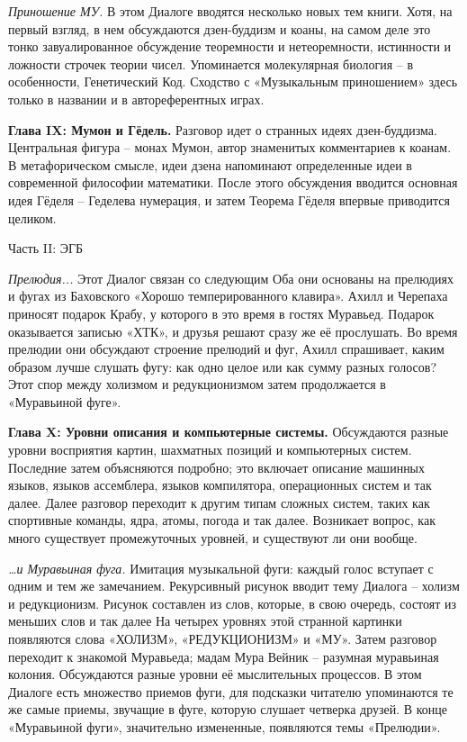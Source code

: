 \documentclass[../main.tex]{subfiles}
\begin{document}
\emph{Приношение МУ.}
В этом Диалоге вводятся несколько новых тем книги. Хотя, на первый взгляд, в нем обсуждаются дзен-буддизм и коаны, на самом деле это тонко завуалированное обсуждение теоремности и нетеоремности, истинности и ложности строчек теории чисел. Упоминается молекулярная биология \--- в особенности, Генетический Код. Сходство с «Музыкальным приношением» здесь только в названии и в автореферентных играх.

\textbf{Глава IX: Мумон и Гёдель.}
Разговор идет о странных идеях дзен-буддизма. Центральная фигура \--- монах Мумон, автор знаменитых комментариев к коанам. В метафорическом смысле, идеи дзена напоминают определенные идеи в современной философии математики. После этого обсуждения вводится основная идея Гёделя \--- Геделева нумерация, и затем Теорема Гёделя впервые приводится целиком.


\begin{center}
    \Large
    Часть II: ЭГБ
\end{center}

\emph{Прелюдия...}
Этот Диалог связан со следующим Оба они основаны на прелюдиях и фугах из Баховского «Хорошо темперированного клавира». Ахилл и Черепаха приносят подарок Крабу, у которого в это время в гостях Муравьед. Подарок оказывается записью «ХТК», и друзья решают сразу же её прослушать. Во время прелюдии они обсуждают строение прелюдий и фуг, Ахилл спрашивает, каким образом лучше слушать фугу: как одно целое или как сумму разных голосов? Этот спор между холизмом и редукционизмом затем продолжается в «Муравьиной фуге».

\textbf{Глава X: Уровни описания и компьютерные системы.}
Обсуждаются разные уровни восприятия картин, шахматных позиций и компьютерных систем. Последние затем объясняются подробно; это включает описание машинных языков, языков ассемблера, языков компилятора, операционных систем и так далее. Далее разговор переходит к другим типам сложных систем, таких как спортивные команды, ядра, атомы, погода и так далее. Возникает вопрос, как много существует промежуточных уровней, и существуют ли они вообще.

\emph{\ldots и Муравьиная фуга.}
Имитация музыкальной фуги: каждый голос вступает с одним и тем же замечанием. Рекурсивный рисунок вводит тему Диалога \--- холизм и редукционизм. Рисунок составлен из слов, которые, в свою очередь, состоят из меньших слов и так далее На четырех уровнях этой странной картинки появляются слова «ХОЛИЗМ», «РЕДУКЦИОНИЗМ» и «МУ». Затем разговор переходит к знакомой Муравьеда; мадам Мура Вейник \--- разумная муравьиная колония. Обсуждаются разные уровни её мыслительных процессов. В этом Диалоге есть множество приемов фуги, для подсказки читателю упоминаются те же самые приемы, звучащие в фуге, которую слушает четверка друзей. В конце «Муравьиной фуги», значительно измененные, появляются темы «Прелюдии».
\end{document}
